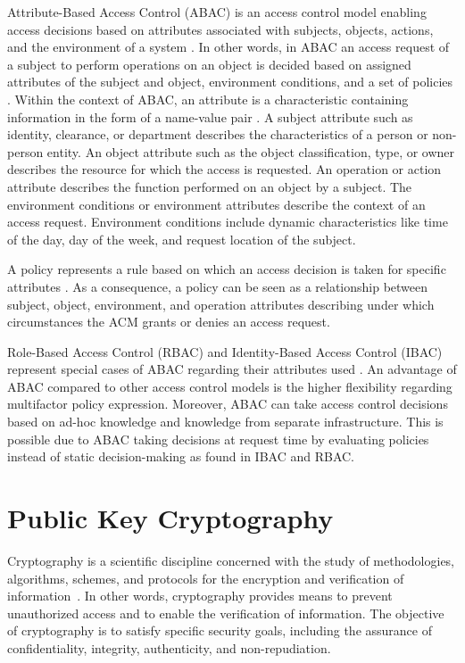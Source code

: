 Attribute-Based Access Control (ABAC) is an access control model enabling access decisions based on attributes associated with subjects, objects, actions, and the environment of a system \cite{JTF2020}.
In other words, in ABAC an access request of a subject to perform operations on an object is decided based on assigned attributes of the subject and object, environment conditions, and a set of policies \cite{Hu2014}.
Within the context of ABAC, an attribute is a characteristic containing information in the form of a name-value pair \cite{Hu2014}.
A subject attribute such as identity, clearance, or department describes the characteristics of a person or non-person entity.
An object attribute such as the object classification, type, or owner describes the resource for which the access is requested.
An operation or action attribute describes the function performed on an object by a subject.
The environment conditions or environment attributes describe the context of an access request.
Environment conditions include dynamic characteristics like time of the day, day of the week, and request location of the subject.

A policy represents a rule based on which an access decision is taken for specific attributes \cite{Hu2014}.
As a consequence, a policy can be seen as a relationship between subject, object, environment, and operation attributes describing under which circumstances the ACM grants or denies an access request.

Role-Based Access Control (RBAC) and Identity-Based Access Control (IBAC) represent special cases of ABAC regarding their attributes used \cite{Hu2014}.
An advantage of ABAC compared to other access control models is the higher flexibility regarding multifactor policy expression.
Moreover, ABAC can take access control decisions based on ad-hoc knowledge and knowledge from separate infrastructure.
This is possible due to ABAC taking decisions at request time by evaluating policies instead of static decision-making as found in IBAC and RBAC.

\section{Public Key Cryptography}
\label{sec:fundamentals:cryptography}
Cryptography is a scientific discipline concerned with the study of methodologies, algorithms, schemes, and protocols for the encryption and verification of information~\cite{Barker2016,Barker2020,CNSS2022}.
In other words, cryptography provides means to prevent unauthorized access and to enable the verification of information.
The objective of cryptography is to satisfy specific security goals, including the assurance of confidentiality, integrity, authenticity, and non-repudiation.


